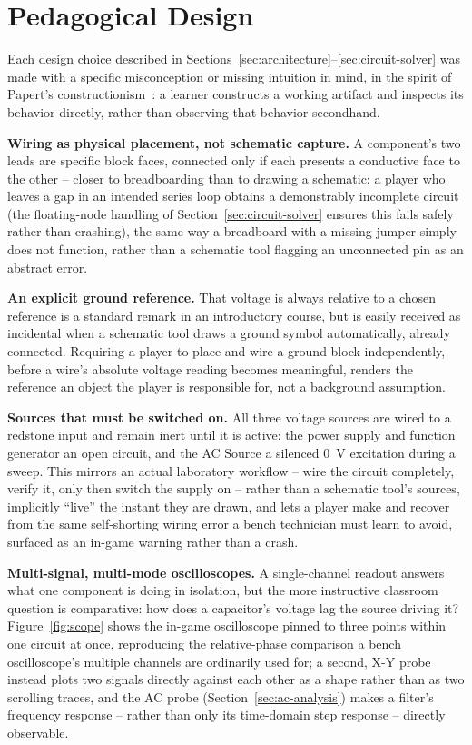 \section{Pedagogical Design}
\label{sec:pedagogy}

Each design choice described in Sections~\ref{sec:architecture}--\ref{sec:circuit-solver}
was made with a specific misconception or missing intuition in mind, in the spirit of
Papert's constructionism~\cite{papert1980mindstorms}: a learner constructs a working artifact
and inspects its behavior directly, rather than observing that behavior secondhand.

\textbf{Wiring as physical placement, not schematic capture.} A component's two leads are
specific block faces, connected only if each presents a conductive face to the other -- closer
to breadboarding than to drawing a schematic: a player who leaves a gap in an intended series
loop obtains a demonstrably incomplete circuit (the floating-node handling of
Section~\ref{sec:circuit-solver} ensures this fails safely rather than crashing), the same way
a breadboard with a missing jumper simply does not function, rather than a schematic tool
flagging an unconnected pin as an abstract error.

\textbf{An explicit ground reference.} That voltage is always relative to a chosen reference
is a standard remark in an introductory course, but is easily received as incidental when a
schematic tool draws a ground symbol automatically, already connected. Requiring a player to
place and wire a ground block independently, before a wire's absolute voltage reading becomes
meaningful, renders the reference an object the player is responsible for, not a background
assumption.

\textbf{Sources that must be switched on.} All three voltage sources are wired to a redstone
input and remain inert until it is active: the power supply and function generator an open
circuit, and the AC Source a silenced 0~V excitation during a sweep. This mirrors an actual
laboratory workflow -- wire the circuit completely, verify it, only then switch the supply
on -- rather than a schematic tool's sources, implicitly ``live'' the instant they are drawn,
and lets a player make and recover from the same self-shorting wiring error a bench
technician must learn to avoid, surfaced as an in-game warning rather than a crash.

\textbf{Multi-signal, multi-mode oscilloscopes.} A single-channel readout answers what one
component is doing in isolation, but the more instructive classroom question is comparative:
how does a capacitor's voltage lag the source driving it? Figure~\ref{fig:scope} shows the
in-game oscilloscope pinned to three points within one circuit at once, reproducing the
relative-phase comparison a bench oscilloscope's multiple channels are ordinarily used for; a
second, X-Y probe instead plots two signals directly against each other as a shape rather than
as two scrolling traces, and the AC probe (Section~\ref{sec:ac-analysis}) makes a filter's
frequency response -- rather than only its time-domain step response -- directly observable.

